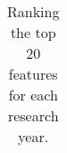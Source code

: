 \begin{table}[h]
\begin{center}
\begin{tabular}{|l||l l|l l|l l|l l|l l|}
    \end{tabular}
    \end{center}
    \caption{Ranking the top 20 features for each research year.}
\label{table:featureRank}
\end{table}


